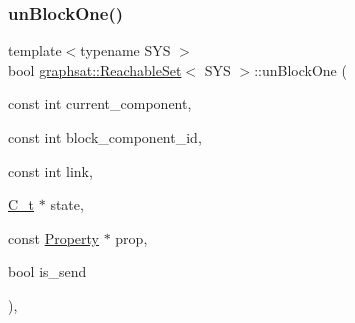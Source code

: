 \subsubsection{\texorpdfstring{unBlockOne()}{unBlockOne()}}
{\footnotesize\ttfamily template$<$typename S\+YS $>$ \\
bool \mbox{\hyperlink{classgraphsat_1_1_reachable_set}{graphsat\+::\+Reachable\+Set}}$<$ S\+YS $>$\+::un\+Block\+One (\begin{DoxyParamCaption}\item[{const int}]{current\+\_\+component,  }\item[{const int}]{block\+\_\+component\+\_\+id,  }\item[{const int}]{link,  }\item[{\mbox{\hyperlink{classgraphsat_1_1_reachable_set_a0b7981a216ec4c46be913e08d5f0cd07}{C\+\_\+t}} $\ast$}]{state,  }\item[{const \mbox{\hyperlink{classgraphsat_1_1_property}{Property}} $\ast$}]{prop,  }\item[{bool}]{is\+\_\+send }\end{DoxyParamCaption})\hspace{0.3cm}{\ttfamily [inline]}, {\ttfamily [private]}}

